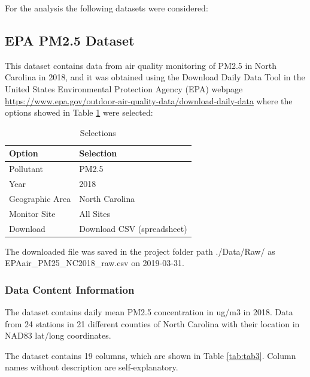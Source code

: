 \documentclass[12pt,]{article}
\begin{document}
For the analysis the following datasets were considered:

\subsection{EPA PM2.5 Dataset}\label{epa-pm2.5-dataset}

This dataset contains data from air quality monitoring of PM2.5 in North
Carolina in 2018, and it was obtained using the Download Daily Data Tool
in the United States Environmental Protection Agency (EPA) webpage
\url{https://www.epa.gov/outdoor-air-quality-data/download-daily-data}
where the options showed in Table \ref{tab:tab1} were selected:

\begin{table}[ht]
\centering
\begin{tabular}{ll}
  \hline
Option & Selection \\ 
  \hline
Pollutant & PM2.5 \\ 
  Year & 2018 \\ 
  Geographic Area & North Carolina \\ 
  Monitor Site & All Sites \\ 
  Download & Download CSV (spreadsheet) \\ 
   \hline
\end{tabular}
\caption{Selections} 
\label{tab:tab1}
\end{table}

The downloaded file was saved in the project folder path ./Data/Raw/ as
EPAair\_PM25\_NC2018\_raw.csv on 2019-03-31.

\subsubsection{Data Content Information}\label{data-content-information}

The dataset contains daily mean PM2.5 concentration in ug/m3 in 2018.
Data from 24 stations in 21 different counties of North Carolina with
their location in NAD83 lat/long coordinates.

The dataset contains 19 columns, which are shown in Table
\ref{tab:tab3}. Column names without description are self-explanatory.
\end{document}
